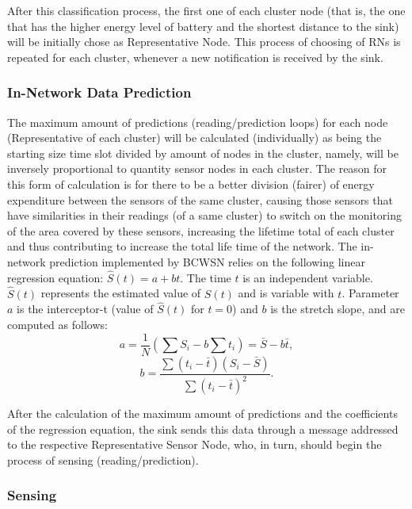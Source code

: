 \documentclass[conference]{IEEEtran}
\begin{document}
After this classification process, the first one of each cluster node (that is,
the one that has the higher energy level of battery and the shortest distance to
the sink) will be initially chose as Representative Node. This process of
choosing of RNs is repeated for each cluster, whenever a new notification is
received by the sink.

\subsubsection{In-Network Data Prediction}
\label{data-predict}

The maximum amount of predictions (reading/prediction loops) for each node
(Representative of each cluster) will be calculated (individually) as being the
starting size time slot divided by amount of nodes in the cluster, namely, will
be inversely proportional to quantity sensor nodes in each cluster. The reason
for this form of calculation is for there to be a better division (fairer) of
energy expenditure between the sensors of the same cluster, causing those
sensors that have similarities in their readings (of a same cluster) to switch
on the monitoring of the area covered by these sensors, increasing the lifetime
total of each cluster and thus contributing to increase the total life time of
the network. The in-network prediction implemented by BCWSN relies on the
following linear regression equation: $\hat{S}(t) = a + bt$.
The time $t$ is an independent variable. $\hat{S}(t)$ represents the estimated
value of $S(t)$ and is variable with $t$. Parameter $a$ is the interceptor-t
(value of $\hat{S}(t)$ for $t=0$) and $b$ is the stretch slope, and are computed
as follows:
\begin{equation}
	a = \frac{1}{N}\left(\sum S_{i} - b\sum t_{i} \right) = \bar{S} - b\bar{t},
\end{equation}
\vspace*{-.3cm}
\begin{equation}
	b = \frac{\sum \left(t_{i} - \bar{t}\right)\left(S_{i} - \bar{S}\right)}{\sum \left(t_{i} - \bar{t}\right)^{2}}.
\end{equation}

After the calculation of the maximum amount of predictions and the coefficients
of the regression equation, the sink sends this data through a message addressed
to the respective Representative Sensor Node, who, in turn, should begin the
process of sensing (reading/prediction).

\subsubsection{Sensing}
\end{document}
